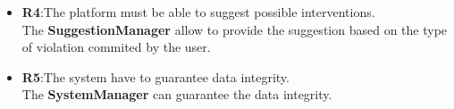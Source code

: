 \begin{itemize}
	
	\item 
	\textbf{R4}:The platform must be able to suggest possible interventions. \\
	The \textbf{SuggestionManager} allow to provide the suggestion based on the type of violation commited by the user.
	
	\item 
	\textbf{R5}:The system have to guarantee data integrity. \\ 
	The \textbf{SystemManager} can guarantee the data integrity.
	
	
	
	
	
\end{itemize}